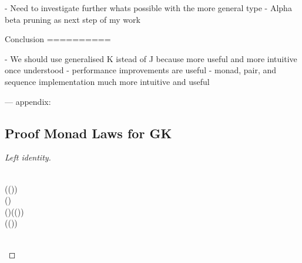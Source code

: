 - Need to investigate further whats possible with the more general type
- Alpha beta pruning as next step of my work

Conclusion
==========

- We should use generalised K istead of J because more useful and more intuitive 
  once understood
- performance improvements are useful
- monad, pair, and sequence implementation much more intuitive and useful


--- 
appendix:
  \subsection*{Proof Monad Laws for GK}\label{GK-monad-laws}

  \begin{proof}[Left identity]

  \begin{hscode}\SaveRestoreHook
{}%
%
%
\>[3]{}\;\bind {}\<[E]%
\\[\blanklineskip]%
\>[3]{}\mathrel{=}(\;(\mathbin{\$}))\;\bind {}\<[E]%
\\[\blanklineskip]%
\>[3]{}\mathrel{=}(\lambda {}\to {}\;)\bind {}\<[E]%
\\[\blanklineskip]%
\>[3]{}\mathrel{=}\lambda {}\to (\lambda {}\to {}\;)\;((\;)\;){}\<[E]%
\\[\blanklineskip]%
\>[3]{}\mathrel{=}\lambda {}\to ((\;)\;)\;\<[E]%
\\[\blanklineskip]%
\>[3]{}\mathrel{=}\lambda {}\to {}\;\;\<[E]%
\\[\blanklineskip]%
\>[3]{}\mathrel{=}\;\<[E]%
\ColumnHook
\end{hscode}\resethooks

  \end{proof}
    
